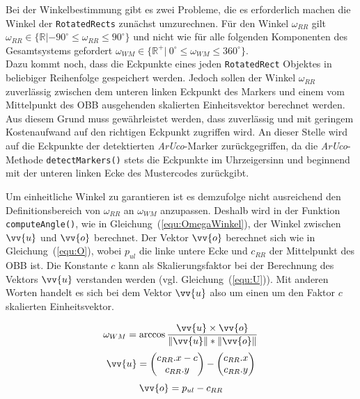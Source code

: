 Bei der Winkelbestimmung gibt es zwei Probleme, die es erforderlich machen die Winkel der \texttt{Rotated\-Rects} zunächst umzurechnen. Für den Winkel $\omega_{RR}$ gilt  $\omega_{RR} \in \{\mathbb{R} | -90^\circ \le \omega_{RR} \le 90^\circ\}$ und nicht wie für alle folgenden Komponenten des Gesamtsystems gefordert $\omega_{WM} \in \{\mathbb{R}^+ |\ 0 ^\circ \le \omega_{WM} \le 360^\circ\}$. \\
Dazu kommt noch, dass die Eckpunkte eines jeden \texttt{Rotated\-Rect} Objektes in beliebiger Reihenfolge gespeichert werden. Jedoch sollen der Winkel $\omega_{RR}$ zuverlässig zwischen dem unteren linken Eckpunkt des Markers und einem vom Mittelpunkt des OBB ausgehenden skalierten Einheitsvektor berechnet werden. Aus diesem Grund muss gewährleistet werden, dass zuverlässig und mit geringem Kostenaufwand auf den richtigen Eckpunkt zugriffen wird. An dieser Stelle wird auf die Eckpunkte der detektierten \textit{ArUco}-Marker zurückgegriffen, da die \textit{ArUco}-Methode \texttt{detect\-Markers()} stets die Eckpunkte im Uhrzeigersinn und beginnend mit der unteren linken Ecke des Mustercodes zurückgibt.

Um einheitliche Winkel zu garantieren ist es demzufolge nicht ausreichend den Definitionsbereich von $\omega_{RR}$ an $\omega_{WM}$ anzupassen. Deshalb wird in der Funktion \texttt{compute\-Angle()}, wie in Gleichung~(\ref{equ:OmegaWinkel}), der Winkel zwischen $\vv{u}$ und $\vv{o}$ berechnet. Der Vektor $\vv{o}$ berechnet sich wie in Gleichung~(\ref{equ:O}), wobei $p_{ul}$ die linke untere Ecke und $c_{RR}$ der Mittelpunkt des OBB ist. Die Konstante $c$ kann als Skalierungsfaktor bei der Berechnung des Vektors $\vv{u}$ verstanden werden (vgl. Gleichung~(\ref{equ:U})). Mit anderen Worten handelt es sich bei dem Vektor $\vv{u}$ also um einen um den Faktor $c$ skalierten Einheitsvektor.

\begin{equation}
\label{equ:OmegaWinkel}
\omega_{WM} = \arccos \frac{\vv{u} \times \vv{o}}{\|\vv{u}\|*\|\vv{o}\|} 
\end{equation}
\begin{equation}
\label{equ:U}
\vv{u} = \begin{pmatrix}
c_{RR}.x - c\\ c_{RR}.y
\end{pmatrix}
- \begin{pmatrix}
c_{RR}.x\\ c_{RR}.y
\end{pmatrix}
\end{equation}
\begin{equation}
\label{equ:O}
\vv{o}=p_{ul}-c_{RR}
\end{equation}

